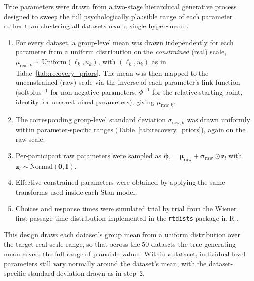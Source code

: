 \documentclass[man,floatsintext]{apa7}
\begin{document}
True parameters were drawn from a two-stage hierarchical generative process designed to sweep the full psychologically plausible range of each parameter rather than clustering all datasets near a single hyper-mean \parencite[cf.][]{baribault_troubleshooting_2025}:
\begin{enumerate}
    \item For every dataset, a group-level mean was drawn independently for each parameter from a uniform distribution on the \emph{constrained} (real) scale, $\mu_{\text{real}, k} \sim \text{Uniform}(\ell_k, u_k)$, with $(\ell_k, u_k)$ as in Table~\ref{tab:recovery_priors}. The mean was then mapped to the unconstrained (raw) scale via the inverse of each parameter's link function (softplus${}^{-1}$ for non-negative parameters, $\Phi^{-1}$ for the relative starting point, identity for unconstrained parameters), giving $\mu_{\text{raw}, k}$.
    \item The corresponding group-level standard deviation $\sigma_{\text{raw}, k}$ was drawn uniformly within parameter-specific ranges (Table~\ref{tab:recovery_priors}), again on the raw scale.
    \item Per-participant raw parameters were sampled as $\boldsymbol{\phi}_l = \boldsymbol{\mu}_{\text{raw}} + \boldsymbol{\sigma}_{\text{raw}} \odot \mathbf{z}_l$ with $\mathbf{z}_l \sim \text{Normal}(\mathbf{0}, \mathbf{I})$.
    \item Effective constrained parameters were obtained by applying the same transforms used inside each Stan model.
    \item Choices and response times were simulated trial by trial from the Wiener first-passage time distribution implemented in the \texttt{rtdists} package in R \parencite{singmann_rtdists_2016}.
\end{enumerate}

This design draws each dataset's group mean from a uniform distribution over the target real-scale range, so that across the 50 datasets the true generating mean covers the full range of plausible values. Within a dataset, individual-level parameters still vary normally around the dataset's mean, with the dataset-specific standard deviation drawn as in step~2.
\end{document}
